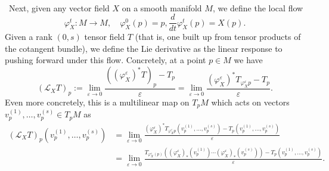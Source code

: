 \documentclass[11pt,letterpaper]{article}
\newcommand{\LP}{\left(}
\newcommand{\RP}{\right)}
\newcommand{\mc}[1]{\mathcal{#1}}
\begin{document}
\\
\
Next, given any vector field $X$ on a smooth manifold $M$, we define the local flow \begin{equation}
\varphi_X^t: M \to M, \quad \varphi_X^0(p) = p, \frac{d}{dt} \varphi_X^t(p) = X(p).
\end{equation}
Given a rank $(0,s)$ tensor field $T$ (that is, one built up from tensor products of the cotangent bundle), we define the Lie derivative as the linear response to pushing forward under this flow. Concretely, at a point $p \in M$ we have \begin{equation}
\LP \mc{L}_X T \RP_p := \lim_{\varepsilon \to 0} \frac{\LP \LP \varphi_X^\varepsilon \RP^* T \RP_p - T_p}{\varepsilon} = \lim_{\varepsilon \to 0} \frac{\LP \varphi_X^\varepsilon \RP^* T_{\varphi_X^\varepsilon p} - T_p}{\varepsilon}.
\end{equation}
Even more concretely, this is a multilinear map on $T_p M$ which acts on vectors $v_p^{(1)}, \ldots, v_p^{(s)} \in T_p M$ as \begin{equation}
\begin{aligned}
\LP \mc{L}_X T \RP_p \LP v_p^{(1)}, \ldots, v_p^{(s)} \RP & = \lim_{\varepsilon \to 0} \frac{\LP \varphi_X^\varepsilon \RP^* T_{\varphi_X^\varepsilon p} \LP v_p^{(1)}, \ldots, v_p^{(s)} \RP - T_p \LP v_p^{(1)}, \ldots, v_p^{(s)} \RP}{\varepsilon} \\
& = \lim_{\varepsilon \to 0} \frac{ T_{\varphi^\varepsilon_X (p)} \LP \LP \varphi^\varepsilon_X \RP_* \LP v_p^{(1)} \RP \cdots \LP \varphi^\varepsilon_X \RP_* \LP v_p^{(s)} \RP \RP - T_p \LP v_p^{(1)}, \ldots, v_p^{(s)} \RP}{\varepsilon}.
\end{aligned}
\end{equation}
\end{document}
